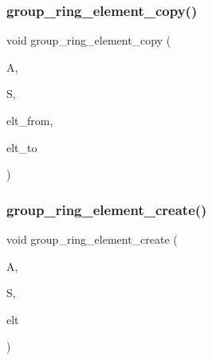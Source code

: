 \subsubsection{\texorpdfstring{group\+\_\+ring\+\_\+element\+\_\+copy()}{group\_ring\_element\_copy()}}
{\footnotesize\ttfamily void group\+\_\+ring\+\_\+element\+\_\+copy (\begin{DoxyParamCaption}\item[{\mbox{\hyperlink{classaction}{action}} $\ast$}]{A,  }\item[{\mbox{\hyperlink{classsims}{sims}} $\ast$}]{S,  }\item[{\mbox{\hyperlink{galois_8h_a09fddde158a3a20bd2dcadb609de11dc}{I\+NT}} $\ast$}]{elt\+\_\+from,  }\item[{\mbox{\hyperlink{galois_8h_a09fddde158a3a20bd2dcadb609de11dc}{I\+NT}} $\ast$}]{elt\+\_\+to }\end{DoxyParamCaption})}

\mbox{\label{action__global_8_c_ada8daaf3a2b856f318124282d698a183}} 
\subsubsection{\texorpdfstring{group\+\_\+ring\+\_\+element\+\_\+create()}{group\_ring\_element\_create()}}
{\footnotesize\ttfamily void group\+\_\+ring\+\_\+element\+\_\+create (\begin{DoxyParamCaption}\item[{\mbox{\hyperlink{classaction}{action}} $\ast$}]{A,  }\item[{\mbox{\hyperlink{classsims}{sims}} $\ast$}]{S,  }\item[{\mbox{\hyperlink{galois_8h_a09fddde158a3a20bd2dcadb609de11dc}{I\+NT}} $\ast$\&}]{elt }\end{DoxyParamCaption})}

\mbox{\label{action__global_8_c_a365bffb4c4f5ded832a609c046b99b63}} 
